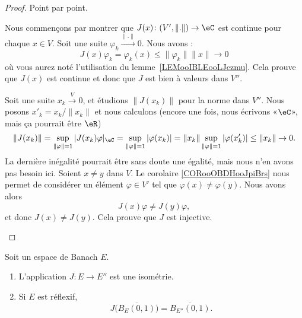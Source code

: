 \begin{proof}
	Point par point.
	\begin{subproof}
		\spitem[\ref{ITEMooNVVSooNFXgnE}]
		Nous commençons par montrer que \( J(x)\colon (V',\| . \|)\to \eC\) est continue pour chaque \( x\in V\). Soit une suite \( \varphi_k\stackrel{\| . \|}{\longrightarrow}0\). Nous avons :
		\begin{equation}
			J(x)\varphi_k=\varphi_k(x)\leq \| \varphi_k \|\| x \|\to 0
		\end{equation}
		où vous aurez noté l'utilisation du lemme~\ref{LEMooIBLEooLJczmu}.  Cela prouve que \( J(x)\) est continue et donc que \( J\) est bien à valeurs dans \( V''\).
		\spitem[\ref{ITEMooKURHooZZWpbu}]

		Soit une suite \( x_k\stackrel{V}{\longrightarrow}0\), et étudions \( \| J(x_k) \|\) pour la norme dans \( V''\). Nous posons \( x'_k=x_k/\| x_k \|\) et nous calculons (encore une fois, nous écrivons «\( \eC\)», mais ça pourrait être \( \eR\))
		\begin{equation}
			\| J(x_k) \|=\sup_{\| \varphi \|=1}| J(x_k)\varphi |_{\eC}=\sup_{\| \varphi \|=1}| \varphi(x_k) |=\| x_k \|\sup_{\| \varphi \|=1}| \varphi(x'_k) |\leq \| x_k \|\to 0.
		\end{equation}
		La dernière inégalité pourrait être sans doute une égalité, mais nous n'en avons pas besoin ici.
		\spitem[\ref{ITEMooTFYVooKhMOjp}]
		Soient \( x\neq y\) dans \( V\). Le corolaire \ref{CORooOBDHooJpiBrs} nous permet de considérer un élément \( \varphi\in V'\) tel que \( \varphi(x)\neq \varphi(y)\). Nous avons alors
		\begin{equation}
			J(x)\varphi\neq J(y)\varphi,
		\end{equation}
		et donc \( J(x)\neq J(y)\). Cela prouve que \( J\) est injective.
	\end{subproof}
\end{proof}

\begin{proposition}	\label{PROPooQGHTooLMFCKt}
	Soit un espace de Banach \( E\).
	\begin{enumerate}
		\item
		      L'application \(J \colon E\to E''  \) est une isométrie.
		\item		\label{ITEMooFTFBooMjahZi}
		      Si \( E\) est réflexif,
		      \begin{equation}
			      J\big( \overline{B_E(0,1)} \big)=\overline{B_{E''}(0,1)}.
		      \end{equation}
	\end{enumerate}
\end{proposition}

